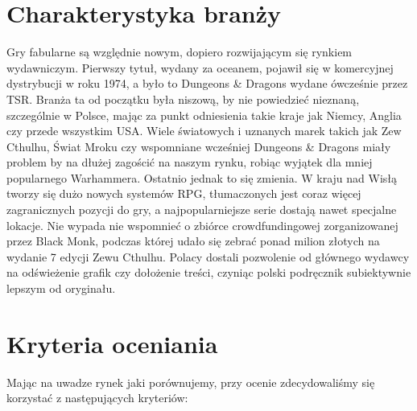 \documentclass[a4paper,11pt]{article}
\begin{document}
\setcounter{page}{2}


\section {Charakterystyka branży}

Gry fabularne są względnie nowym, dopiero rozwijającym się rynkiem wydawniczym. Pierwszy tytuł, wydany za oceanem, pojawił się w komercyjnej dystrybucji w roku 1974, a było to Dungeons \& Dragons wydane ówcześnie przez TSR. Branża ta od początku była niszową, by nie powiedzieć nieznaną, szczególnie w Polsce, mając za punkt odniesienia takie kraje jak Niemcy, Anglia czy przede wszystkim USA. Wiele światowych i uznanych marek takich jak Zew Cthulhu, Świat Mroku czy wspomniane wcześniej Dungeons \& Dragons miały problem by na dłużej zagościć na naszym rynku, robiąc wyjątek dla mniej popularnego Warhammera. Ostatnio jednak to się zmienia. W kraju nad Wisłą tworzy się dużo nowych systemów RPG, tłumaczonych jest coraz więcej zagranicznych pozycji do gry, a najpopularniejsze serie dostają nawet specjalne lokacje. Nie wypada nie wspomnieć o zbiórce crowdfundingowej zorganizowanej przez Black Monk, podczas której udało się zebrać ponad milion złotych na wydanie 7 edycji Zewu Cthulhu. Polacy dostali pozwolenie od głównego wydawcy na odświeżenie grafik czy dołożenie treści, czyniąc polski podręcznik subiektywnie lepszym od oryginału.


\section {Kryteria oceniania}

Mając na uwadze rynek jaki porównujemy, przy ocenie zdecydowaliśmy się korzystać z następujących kryteriów:
\end{document}

